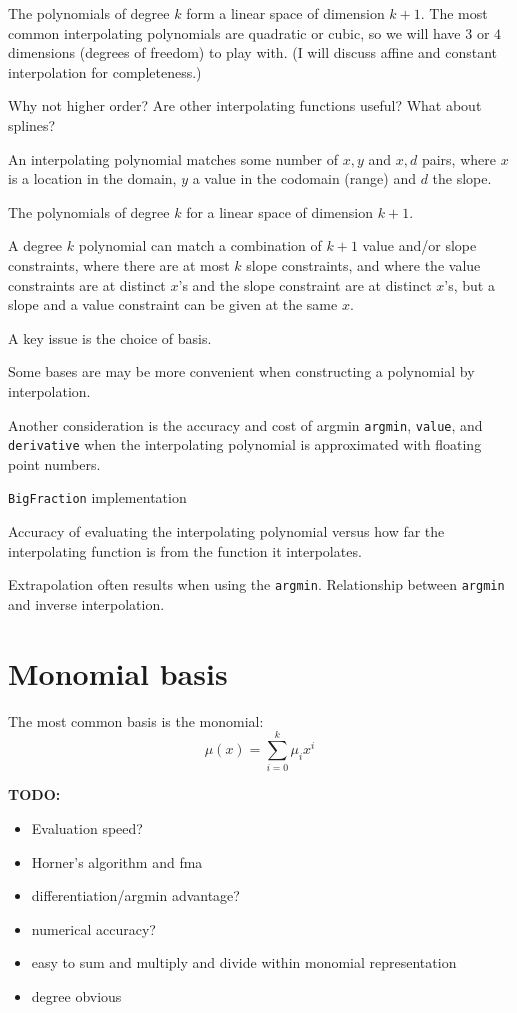 The polynomials of degree $k$ form a linear space of dimension
$k+1$\cite{wiki:Polynomial}.
The most common interpolating polynomials are quadratic or cubic,
so we will have $3$ or $4$ dimensions (degrees of freedom) to play
with. 
(I will discuss affine and constant interpolation for 
completeness.)

Why not higher order? Are other interpolating functions useful?
What about splines?

An interpolating polynomial matches some number of $x,y$
and $x,d$ pairs, where $x$ is a location in the domain,
$y$ a value in the codomain (range) and $d$ the slope.

The polynomials of degree $k$ for a linear space of dimension
$k+1$. 

A degree $k$ polynomial can match a combination of $k+1$ value 
and/or 
slope constraints, where there are at most $k$ slope constraints,
and where the value constraints are at distinct $x$'s and the
slope constraint are at distinct $x$'s, but a slope and a value 
constraint can be given at the same $x$.

A key issue is the choice of basis.

Some bases are may be more convenient when constructing a 
polynomial by interpolation.

Another consideration is the accuracy and cost of 
argmin \texttt{argmin}, \texttt{value}, and \texttt{derivative} 
when the interpolating polynomial is approximated with 
floating point numbers.

\texttt{BigFraction} implementation

Accuracy of evaluating the interpolating polynomial
versus how far the interpolating function is from the function it
interpolates.

Extrapolation often results when using the \texttt{argmin}.
Relationship between \texttt{argmin} and inverse interpolation.

\section{Monomial basis}\label{sec:Monomial-basis}

The most common basis is the monomial:
\begin{equation}
\mu(x) = \sum_{i=0}^{k} \mu_i x^i
\end{equation}

\textbf{TODO:} 
\begin{itemize}
  \item Evaluation speed?
  \item Horner's algorithm and fma
  \item differentiation/argmin advantage?
  \item numerical accuracy?
  \item easy to sum and multiply and divide within monomial
  representation
  \item degree obvious
\end{itemize}

